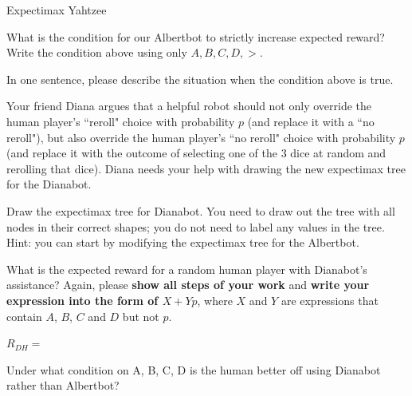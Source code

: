 \begin{problem}{Expectimax Yahtzee}
\begin{question}
\begin{subquestion}[5]
What is the condition for our Albertbot to strictly increase expected reward? Write the condition above using only $A, B, C, D, >$.

\end{subquestion}{}

\begin{subquestion}[2]
In one sentence, please describe the situation when the condition above is true.

\end{subquestion}



\end{question}


\newpage
\begin{question}[]
Your friend Diana argues that a helpful robot should not only override the human player's ``reroll" choice with probability $p$ (and replace it with a ``no reroll"), but also override the human player's ``no reroll" choice with probability $p$ (and replace it with the outcome of selecting one of the 3 dice at random and rerolling that dice). Diana needs your help with drawing the new expectimax tree for the Dianabot.


\begin{subquestion}[5]
Draw the expectimax tree for Dianabot. You need to draw out the tree with all nodes in their correct shapes; you do not need to label any values in the tree. Hint: you can start by modifying the expectimax tree for the Albertbot.
\end{subquestion}

\newpage

\begin{subquestion}[5]
What is the expected reward for a random human player with Dianabot's assistance? Again, please \textbf{show all steps of your work} and \textbf{write your expression into the form of $X + Y p$}, where $X$ and $Y$ are expressions that contain $A$, $B$, $C$ and $D$ but not $p$.

$R_{DH} =$

\end{subquestion}

\begin{subquestion}[5]
Under what condition on A, B, C, D is the human better off using Dianabot rather than Albertbot?


\end{subquestion}{}



\end{question}





\end{problem}

